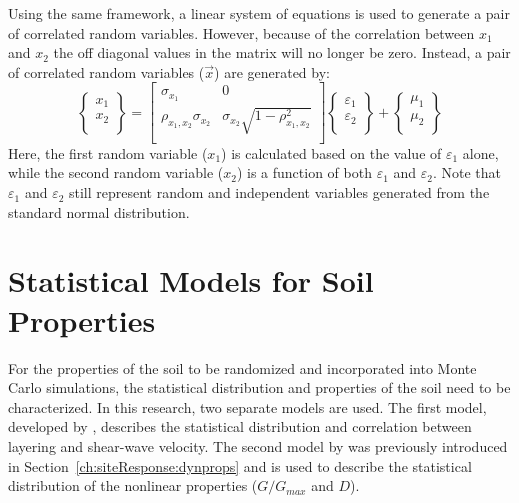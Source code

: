 \documentclass[11pt]{report}
\begin{document}
Using the same framework, a linear system of equations is used to generate a pair of correlated
random variables.  However, because of the correlation between $x_1$ and $x_2$ the off diagonal
values in the matrix will no longer be zero.  Instead, a pair of correlated random variables
($\vec{x}$) are generated by:
\begin{equation}
  \left\{
  \begin{array}{c}
	x_1 \\
	x_2 \\
  \end{array}
  \right\} 
  =
  \left[
  \begin{array}{cc}
	\sigma_{x_1} & 0 \\
	\rho_{x_1,x_2}\sigma_{x_2} & \sigma_{x_2} \sqrt{1 - \rho_{x_1,x_2}^2} \\ 
  \end{array}
  \right]
  \left\{
  \begin{array}{c}
	\varepsilon_1 \\
	\varepsilon_2 \\
  \end{array}
  \right\}
  + 
  \left\{
  \begin{array}{c}
	\mu_1 \\
	\mu_2 \\
  \end{array}
  \right\}
  \label{eq:linearSystem:correlSol}
\end{equation} %
Here, the first random variable ($x_1$) is calculated based on the value of $\varepsilon_1$ alone,
while the second random variable ($x_2$) is a function of both $\varepsilon_1$ and $\varepsilon_2$.
Note that $\varepsilon_1$ and $\varepsilon_2$ still represent random and independent variables
generated from the standard normal distribution.

\section{Statistical Models for Soil Properties}
For the properties of the soil to be randomized and incorporated into Monte Carlo simulations, the
statistical distribution and properties of the soil need to be characterized.  In this research, two
separate models are used.  The first model, developed by \citet{toro:95}, describes the statistical
distribution and correlation between layering and shear-wave velocity.  The second model by
\citet{darendeli:01} was previously introduced in Section~\ref{ch:siteResponse:dynprops} and is used to
describe the statistical distribution of the nonlinear properties ($G/G_{max}$ and $D$).
\end{document}
